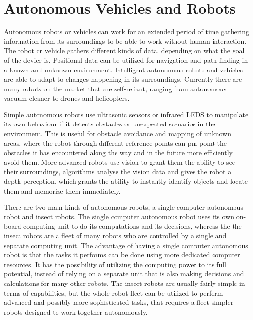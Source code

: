 \clearpage
\section{Autonomous Vehicles and Robots}

Autonomous robots or vehicles can work for an extended period of time gathering information from its surroundings to be able to work without human interaction. The robot or vehicle gathers different kinds of data, depending on what the goal of the device is. Positional data can be utilized for navigation and path finding in a known and unknown environment. Intelligent autonomous robots and vehicles are able to adapt to changes happening in its surroundings.
Currently there are many robots on the market that are self-reliant, ranging from autonomous vacuum cleaner to drones and helicopters. \cite{autonomousbasic}

Simple autonomous robots use ultrasonic sensors or infrared LEDS to manipulate its own behaviour if it detects obstacles or unexpected scenarios in the environment. This is useful for obstacle avoidance and mapping of unknown areas, where the robot through different reference points can pin-point the obstacles it has encountered along the way and in the future more efficiently avoid them.
More advanced robots use vision to grant them the ability to see their surroundings, algorithms analyse the vision data and gives the robot a depth perception, which grants the ability to instantly identify objects and locate them and memorize them immediately.\cite{obstacles}

There are two main kinds of autonomous robots, a single computer autonomous robot and insect robots. The single computer autonomous robot uses its own on-board computing unit to do its computations and its decisions, whereas the the insect robots are a fleet of many robots who are controlled by a single and separate computing unit.
The advantage of having a single computer autonomous robot is that the tasks it performs can be done using more dedicated computer resources. It has the possibility of utilizing the computing power to its full potential, instead of relying on a separate unit that is also making decisions and calculations for many other robots.
The insect robots are usually fairly simple in terms of capabilities, but the whole robot fleet can be utilized to perform advanced and possibly more sophisticated tasks, that requires a fleet simpler robots designed to work together autonomously.\cite{singleandinsect}


